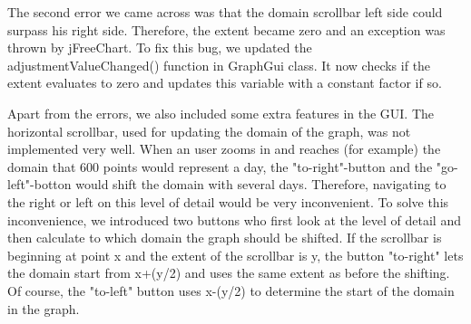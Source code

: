 The second error we came across was that the domain scrollbar left side could surpass his right side. Therefore, the extent became zero and an exception was thrown by jFreeChart. To fix this bug, we updated the adjustmentValueChanged() function in GraphGui class. It now checks if the extent evaluates to zero and updates this variable with a constant factor if so.

Apart from the errors, we also included some extra features in the GUI. The horizontal scrollbar, used for updating the domain of the graph, was not implemented very well. When an user zooms in and reaches (for example) the domain that 600 points would represent a day, the "to-right"-button and the "go-left"-botton would shift the domain with several days. Therefore, navigating to the right or left on this level of detail would be very inconvenient.
To solve this inconvenience, we introduced two buttons who first look at the level of detail and then calculate to which domain the graph should be shifted. If the scrollbar is beginning at point x and the extent of the scrollbar is y, the button "to-right" lets the domain start from x+(y/2) and uses the same extent as before the shifting. Of course, the "to-left" button uses x-(y/2) to determine the start of the domain in the graph.